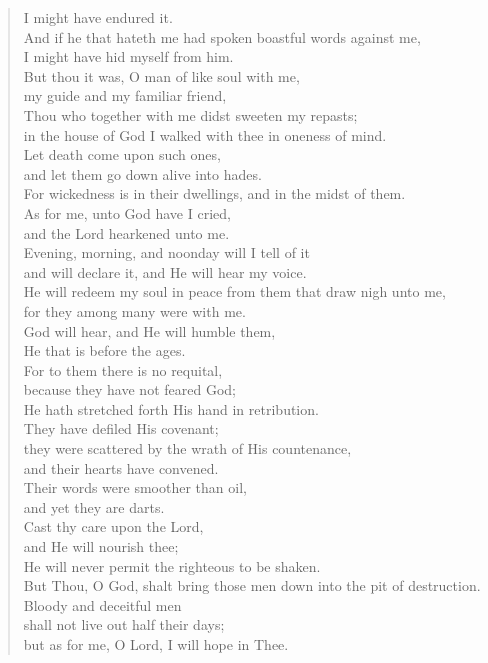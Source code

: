 {\begin{verse}
				I might have endured it.\nolinebreak\\
				And if he that hateth me had spoken boastful words against me,\nolinebreak\\
				I might have hid myself from him.\nolinebreak\\
				But thou it was, O man of like soul with me,\nolinebreak\\
				my guide and my familiar friend,\nolinebreak\\
				Thou who together with me didst sweeten my repasts;\nolinebreak\\
				in the house of God I walked with thee in oneness of mind.\nolinebreak\\
				Let death come upon such ones,\nolinebreak\\
				and let them go down alive into hades.\nolinebreak\\
				For wickedness is in their dwellings, and in the midst of them.\nolinebreak\\
				As for me, unto God have I cried,\nolinebreak\\
				and the Lord hearkened unto me.\nolinebreak\\
				Evening, morning, and noonday will I tell of it\nolinebreak\\
				and will declare it, and He will hear my voice.\nolinebreak\\
				He will redeem my soul in peace from them that draw nigh unto me,\nolinebreak\\
				for they among many were with me.\nolinebreak\\
				God will hear, and He will humble them,\nolinebreak\\
				He that is before the ages.\nolinebreak\\
				For to them there is no requital,\nolinebreak\\
				because they have not feared God;\nolinebreak\\
				He hath stretched forth His hand in retribution.\nolinebreak\\
				They have defiled His covenant;\nolinebreak\\
				they were scattered by the wrath of His countenance,\nolinebreak\\
				and their hearts have convened.\nolinebreak\\
				Their words were smoother than oil,\nolinebreak\\
				and yet they are darts.\nolinebreak\\
				Cast thy care upon the Lord,\nolinebreak\\
				and He will nourish thee;\nolinebreak\\
				He will never permit the righteous to be shaken.\nolinebreak\\
				But Thou, O God, shalt bring those men down into the pit of destruction.\nolinebreak\\
				Bloody and deceitful men\nolinebreak\\
				shall not live out half their days;\nolinebreak\\
				but as for me, O Lord, I will hope in Thee.
			\end{verse}
}
